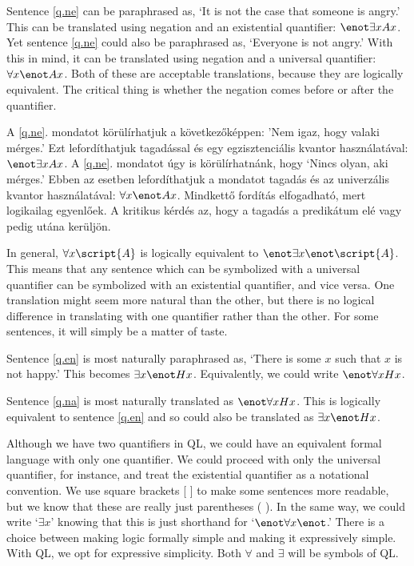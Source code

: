 Sentence \ref{q.ne} can be paraphrased as, `It is not the case that someone is angry.' This can be translated using negation and an existential quantifier: $\enot \exists x Ax$. Yet sentence \ref{q.ne} could also be paraphrased as, `Everyone is not angry.' With this in mind, it can be translated using negation and a universal quantifier: $\forall x \enot Ax$. Both of these are acceptable translations, because they are logically equivalent. The critical thing is whether the negation comes before or after the quantifier.

A \ref{q.ne}. mondatot körülírhatjuk a következőképpen: ’Nem igaz, hogy valaki mérges.’ Ezt lefordíthatjuk tagadással és egy egzisztenciális kvantor használatával: $\enot \exists x Ax$. A \ref{q.ne}. mondatot úgy is körülírhatnánk, hogy ‘Nincs olyan, aki mérges.’ Ebben az esetben lefordíthatjuk a mondatot tagadás és az univerzális kvantor használatával: $\forall x \enot Ax$. Mindkettő fordítás elfogadható, mert logikailag egyenlőek. A kritikus kérdés az, hogy a tagadás a predikátum elé vagy pedig utána kerüljön.



In general, $\forall x\script{A}$ is logically equivalent to $\enot\exists x\enot\script{A}$. This means that any sentence which can be symbolized with a universal quantifier can be symbolized with an existential quantifier, and vice versa. One translation might seem more natural than the other, but there is no logical difference in translating with one quantifier rather than the other. For some sentences, it will simply be a matter of taste.

Sentence \ref{q.en} is most naturally paraphrased as, `There is some $x$ such that $x$ is not happy.' This becomes $\exists x \enot Hx$. Equivalently, we could write $\enot\forall x Hx$.

Sentence \ref{q.na} is most naturally translated as $\enot\forall xHx$. This is logically equivalent to sentence \ref{q.en} and so could also be translated as $\exists x \enot Hx$.

Although we have two quantifiers in QL, we could have an equivalent formal language with only one quantifier. We could proceed with only the universal quantifier, for instance, and treat the existential quantifier as a notational convention. We use square brackets [ ] to make some sentences more readable, but we know that these are really just parentheses ( ). In the same way, we could write `$\exists x$' knowing that this is just shorthand for `$\enot \forall x \enot$.' There is a choice between making logic formally simple and making it expressively simple. With QL, we opt for expressive simplicity. Both $\forall$ and $\exists$ will be symbols of QL.


